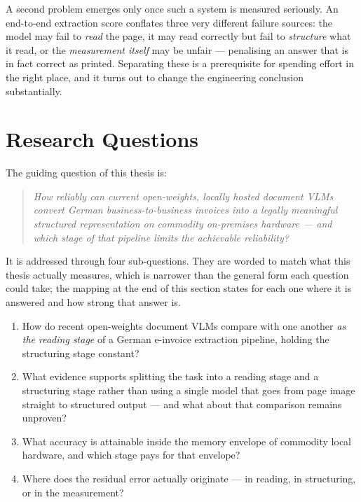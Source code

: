 A second problem emerges only once such a system is measured seriously. An
end-to-end extraction score conflates three very different failure sources: the
model may fail to \emph{read} the page, it may read correctly but fail to
\emph{structure} what it read, or the \emph{measurement itself} may be unfair ---
penalising an answer that is in fact correct as printed. Separating these is a
prerequisite for spending effort in the right place, and it turns out to change the
engineering conclusion substantially.

\section{Research Questions}
\label{sec:research-questions}

The guiding question of this thesis is:

\begin{quote}
\itshape
How reliably can current open-weights, locally hosted document \acp{VLM} convert
German business-to-business invoices into a legally meaningful structured
representation on commodity on-premises hardware --- and which stage of that
pipeline limits the achievable reliability?
\end{quote}

\noindent It is addressed through four sub-questions. They are worded to match
what this thesis actually measures, which is narrower than the general form each
question could take; the mapping at the end of this section states for each one where
it is answered and how strong that answer is.

\begin{enumerate}
  \item\label{rq:readers} How do recent open-weights document \acp{VLM} compare
        with one another \emph{as the reading stage} of a German e-invoice
        extraction pipeline, holding the structuring stage constant?
  \item\label{rq:split} What evidence supports splitting the task into a reading
        stage and a structuring stage rather than using a single model that goes
        from page image straight to structured output --- and what about that
        comparison remains unproven?
  \item\label{rq:envelope} What accuracy is attainable inside the memory envelope
        of commodity local hardware, and which stage pays for that envelope?
  \item\label{rq:attribution} Where does the residual error actually originate
        --- in reading, in structuring, or in the measurement?
\end{enumerate}

